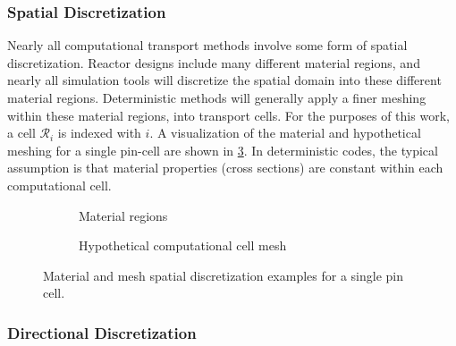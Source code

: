 {{{            \subsubsection{Spatial Discretization}{\label{sssec:NTT:Spatial Discretization}
                Nearly all computational transport methods involve some form of spatial discretization.
                Reactor designs include many different material regions, and nearly all simulation tools will discretize the spatial domain into these different material regions.
                Deterministic methods will generally apply a finer meshing within these material regions, into transport cells.
                For the purposes of this work, a cell $\mathcal{R}_i$ is indexed with $i$.
                A visualization of the material and hypothetical meshing for a single pin-cell are shown in \cref{fig:NTT:Pin Cell}.
                In deterministic codes, the typical assumption is that material properties (cross sections) are constant within each computational cell.

                \begin{figure}[h]
                    \centering
                    \begin{subfigure}[t]{0.45\linewidth}
                        \centering
                        \def\svgwidth{\linewidth}
                        
                        \caption{Material regions}
                        \label{fig:NTT:Pin Cell Materials}
                    \end{subfigure}%
                    \hfill
                    \begin{subfigure}[t]{0.45\linewidth}
                        \centering
                        \def\svgwidth{\linewidth}
                        
                        \caption{Hypothetical computational cell mesh}
                        \label{fig:NTT:Pin Cell Mesh}
                    \end{subfigure}
                    \caption{Material and mesh spatial discretization examples for a single pin cell.}
                    \label{fig:NTT:Pin Cell}
                \end{figure}
            }
            \subsubsection{Directional Discretization}{\label{sssec:NTT:Directional Discretization}
                

}}}}
